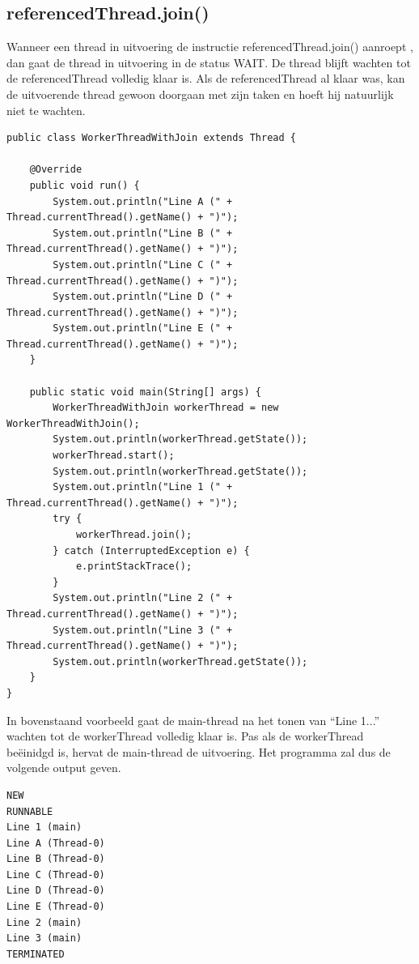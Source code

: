 \documentclass{tstextbook}
\begin{document}
\subsection{referencedThread.join()}

Wanneer een thread in uitvoering de instructie referencedThread.join()  aanroept , dan gaat de  thread in uitvoering in de status WAIT. De thread blijft wachten tot de referencedThread volledig klaar is. Als de referencedThread al klaar was, kan de uitvoerende thread gewoon doorgaan met zijn taken en hoeft hij natuurlijk niet te wachten.


\begin{lstlisting}
public class WorkerThreadWithJoin extends Thread {

	@Override
	public void run() {
		System.out.println("Line A (" + Thread.currentThread().getName() + ")");
		System.out.println("Line B (" + Thread.currentThread().getName() + ")");
		System.out.println("Line C (" + Thread.currentThread().getName() + ")");
		System.out.println("Line D (" + Thread.currentThread().getName() + ")");
		System.out.println("Line E (" + Thread.currentThread().getName() + ")");
	}

	public static void main(String[] args) {
		WorkerThreadWithJoin workerThread = new WorkerThreadWithJoin();
		System.out.println(workerThread.getState());
		workerThread.start();
		System.out.println(workerThread.getState());
		System.out.println("Line 1 (" + Thread.currentThread().getName() + ")");
		try {
			workerThread.join();
		} catch (InterruptedException e) {
			e.printStackTrace();
		}
		System.out.println("Line 2 (" + Thread.currentThread().getName() + ")");
		System.out.println("Line 3 (" + Thread.currentThread().getName() + ")");
		System.out.println(workerThread.getState());
	}
}
\end{lstlisting}

In bovenstaand voorbeeld gaat de main-thread na het tonen van ``Line 1...'' wachten tot de workerThread volledig klaar is. Pas als de workerThread be\"einidgd is, hervat de main-thread de uitvoering. Het programma zal dus de volgende output geven.

\begin{verbatim}
NEW
RUNNABLE
Line 1 (main)
Line A (Thread-0)
Line B (Thread-0)
Line C (Thread-0)
Line D (Thread-0)
Line E (Thread-0)
Line 2 (main)
Line 3 (main)
TERMINATED
\end{verbatim}
\end{document}
